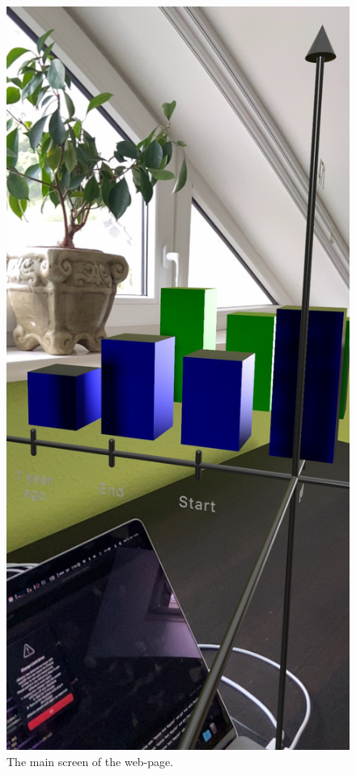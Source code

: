 \documentclass[11pt,a4paper,oneside]{report}
\begin{document}
\begin{figure}[!ht]
  \centering
  \includegraphics[scale=0.2]{side.jpeg}
  \caption{The main screen of the web-page.}
  \label{fig:TexnicCenter}
\end{figure}
\end{document}
